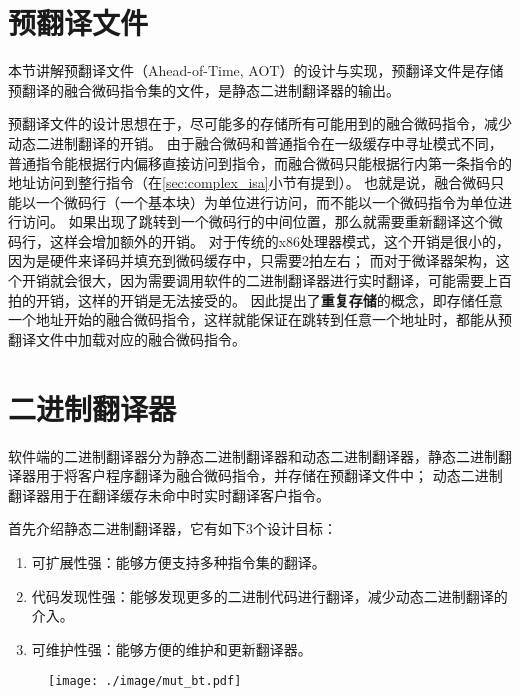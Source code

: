\section{预翻译文件}\label{sec:aot}

本节讲解预翻译文件（Ahead-of-Time, AOT）的设计与实现，预翻译文件是存储预翻译的融合微码指令集的文件，是静态二进制翻译器的输出。

预翻译文件的设计思想在于，尽可能多的存储所有可能用到的融合微码指令，减少动态二进制翻译的开销。
由于融合微码和普通指令在一级缓存中寻址模式不同，普通指令能根据行内偏移直接访问到指令，而融合微码只能根据行内第一条指令的地址访问到整行指令（在\ref{sec:complex_isa}小节有提到）。
也就是说，融合微码只能以一个微码行（一个基本块）为单位进行访问，而不能以一个微码指令为单位进行访问。
如果出现了跳转到一个微码行的中间位置，那么就需要重新翻译这个微码行，这样会增加额外的开销。
对于传统的x86处理器模式，这个开销是很小的，因为是硬件来译码并填充到微码缓存中，只需要2拍左右；
而对于微译器架构，这个开销就会很大，因为需要调用软件的二进制翻译器进行实时翻译，可能需要上百拍的开销，这样的开销是无法接受的。
因此提出了\textbf{重复存储}的概念，即存储任意一个地址开始的融合微码指令，这样就能保证在跳转到任意一个地址时，都能从预翻译文件中加载对应的融合微码指令。


\section{二进制翻译器}

软件端的二进制翻译器分为静态二进制翻译器和动态二进制翻译器，静态二进制翻译器用于将客户程序翻译为融合微码指令，并存储在预翻译文件中；
动态二进制翻译器用于在翻译缓存未命中时实时翻译客户指令。

首先介绍静态二进制翻译器，它有如下3个设计目标：
\begin{enumerate}
  \item 可扩展性强：能够方便支持多种指令集的翻译。
  \item 代码发现性强：能够发现更多的二进制代码进行翻译，减少动态二进制翻译的介入。
  \item 可维护性强：能够方便的维护和更新翻译器。
\end{enumerate}

\begin{figure}[!htbp]
  \centering
  \texttt{[image: ./image/mut\_bt.pdf]}
  \label{img:mut_bt}
\end{figure}

